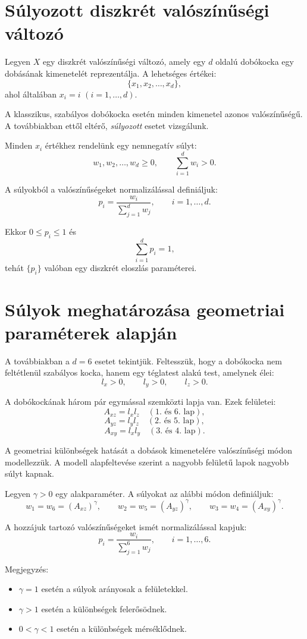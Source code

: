 \documentclass[a4paper,12pt]{article}
\begin{document}
\section{Súlyozott diszkrét valószínűségi változó}

Legyen $X$ egy diszkrét valószínűségi változó, amely egy $d$ oldalú dobókocka
egy dobásának kimenetelét reprezentálja.
A lehetséges értékei:
\[
\{x_1,x_2,\dots,x_d\},
\]
ahol általában $x_i=i$ $(i=1,\dots,d)$.

A klasszikus, szabályos dobókocka esetén minden kimenetel azonos
valószínűségű. A továbbiakban ettől eltérő, \emph{súlyozott} esetet vizsgálunk.

Minden $x_i$ értékhez rendelünk egy nemnegatív súlyt:
\[
w_1,w_2,\dots,w_d \ge 0,
\qquad
\sum_{i=1}^{d} w_i > 0.
\]

A súlyokból a valószínűségeket normalizálással definiáljuk:
\[
p_i = \frac{w_i}{\sum_{j=1}^{d} w_j},
\qquad i=1,\dots,d.
\]

Ekkor $0 \le p_i \le 1$ és
\[
\sum_{i=1}^{d} p_i = 1,
\]
tehát $\{p_i\}$ valóban egy diszkrét eloszlás paraméterei.

\section{Súlyok meghatározása geometriai paraméterek alapján}

A továbbiakban a $d=6$ esetet tekintjük.
Feltesszük, hogy a dobókocka nem feltétlenül szabályos kocka, hanem egy
téglatest alakú test, amelynek élei:
\[
l_x>0, \qquad l_y>0, \qquad l_z>0.
\]

A dobókockának három pár egymással szemközti lapja van.
Ezek felületei:
\[
A_{xz} = l_x l_z \quad (1.\text{ és }6.\text{ lap}),
\]
\[
A_{yz} = l_y l_z \quad (2.\text{ és }5.\text{ lap}),
\]
\[
A_{xy} = l_x l_y \quad (3.\text{ és }4.\text{ lap}).
\]

\medskip
A geometriai különbségek hatását a dobások kimenetelére
valószínűségi módon modellezzük.
A modell alapfeltevése szerint a nagyobb felületű lapok
nagyobb súlyt kapnak.

Legyen $\gamma>0$ egy alakparaméter.
A súlyokat az alábbi módon definiáljuk:
\[
w_1 = w_6 = (A_{xz})^{\gamma}, \qquad
w_2 = w_5 = (A_{yz})^{\gamma}, \qquad
w_3 = w_4 = (A_{xy})^{\gamma}.
\]

A hozzájuk tartozó valószínűségeket ismét normalizálással kapjuk:
\[
p_i = \frac{w_i}{\sum_{j=1}^{6} w_j}, \qquad i=1,\dots,6.
\]

\medskip
Megjegyzés:
\begin{itemize}
  \item $\gamma=1$ esetén a súlyok arányosak a felületekkel.
  \item $\gamma>1$ esetén a különbségek felerősödnek.
  \item $0<\gamma<1$ esetén a különbségek mérséklődnek.
\end{itemize}
\end{document}
